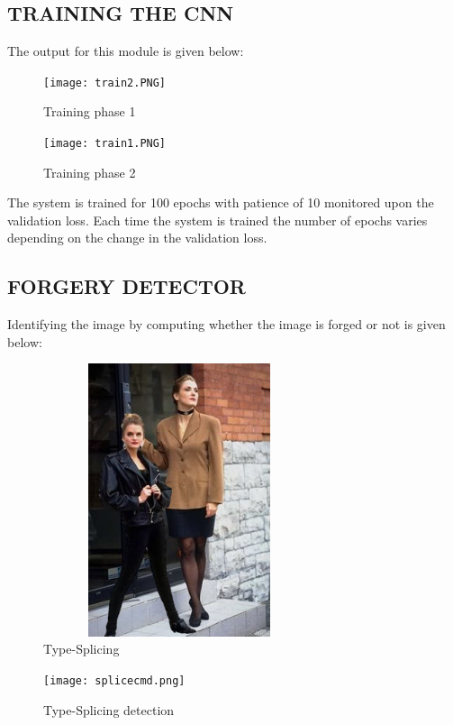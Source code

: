 \newpage

\subsection{TRAINING THE CNN}
The output for this module is given below:

\begin{figure}[htp]
\centering
\texttt{[image: train2.PNG]}
\caption{Training phase 1 }
\label{fig:lion}
\end{figure}
\begin{figure}[htp]
\centering
\texttt{[image: train1.PNG]}
\caption{Training phase 2}
\label{fig:lion}
\end{figure}
 
The system is trained for 100 epochs with patience of 10 monitored upon the validation loss. Each time the system is trained the number of epochs varies depending on the change in the validation loss.

\subsection{FORGERY DETECTOR}
Identifying the image by  computing whether the image is forged or not is given below:


\begin{figure}[htp]
\centering
\includegraphics[width=8cm,height=8cm]{Figures/spli.jpg}
\caption{Type-Splicing }
\label{fig:lion}
\end{figure}

\begin{figure}[htp]
\centering
\texttt{[image: splicecmd.png]}
\caption{Type-Splicing detection}
\label{fig:lion}
\end{figure}

